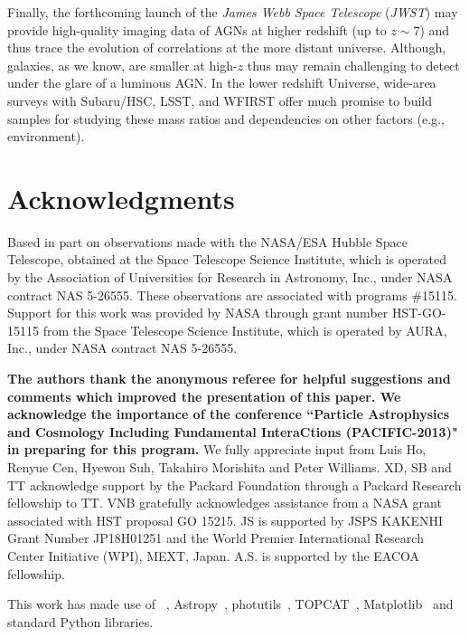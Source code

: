 \documentclass[apj]{emulateapj}
\begin{document}
Finally, the forthcoming launch of the {\it James Webb Space Telescope} ({\it JWST}) may provide high-quality imaging data of AGNs at higher redshift (up to $z\sim7$) and thus trace the evolution of correlations at the more distant universe. Although, galaxies, as we know, are smaller at high-$z$ thus may remain challenging to detect under the glare of a luminous AGN. In the lower redshift Universe, wide-area surveys with Subaru/HSC, LSST, and WFIRST offer much promise to build samples for studying these mass ratios and dependencies on other factors (e.g., environment).  

\section*{Acknowledgments}

Based in part on observations made with the NASA/ESA Hubble Space Telescope, obtained at the Space Telescope Science Institute, which is operated by the Association of Universities for Research in Astronomy, Inc., under NASA contract NAS 5-26555. These observations are associated with programs \#15115. Support for this work was provided by NASA through grant number HST-GO-15115 from the Space Telescope Science Institute, which is operated by AURA, Inc., under NASA contract NAS 5-26555.

{\bf The authors thank the anonymous referee for helpful suggestions and comments which improved the presentation of this paper. We acknowledge the importance of the conference ``Particle Astrophysics and Cosmology Including Fundamental InteraCtions (PACIFIC-2013)" in preparing for this program.} We fully appreciate input from Luis Ho, Renyue Cen, Hyewon Suh, Takahiro Morishita and Peter Williams. XD, SB and TT acknowledge support by the Packard Foundation through a Packard Research fellowship to TT. VNB gratefully acknowledges assistance from a NASA grant associated with HST proposal GO 15215. JS is supported by JSPS KAKENHI Grant Number JP18H01251 and the World Premier International Research Center Initiative (WPI), MEXT, Japan. A.S. is supported by the EACOA fellowship.


This work has made use of \lenstronomy~\citep{lenstronomy}, {\sc Astropy}~\citep{Astropy}, {\sc photutils}~\citep{photutils}, {\sc TOPCAT}~\citep{TOPCAT}, {\sc Matplotlib}~\citep{Matplotlib} %
and standard Python libraries.



\end{document}
